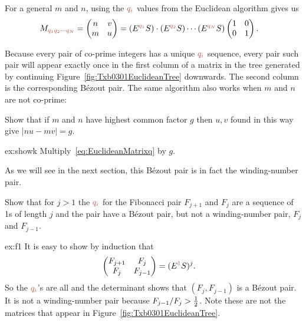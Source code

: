 For a general $m$ and $n$, using the $\jqi$ values from the Euclidean algorithm gives us 
\begin{align}
	M_{\jqn{q_1}\jqn{q_2}\cdots\jqn{q_N}}=\begin{pmatrix} n & v \\ m & u \end{pmatrix}   &= 
	(E^{\jqn{q_1}} S )\cdot( E^{\jqn{q_2}} S ) \cdots  (E^{\jqn{q_N}} S)  \begin{pmatrix} 1&0  \\ 0&1 \end{pmatrix}.
	\label{eq:EuclideanMatrixq}
\end{align}

Because every pair of co-prime integers has a unique $\jqi$ sequence, every pair such pair will appear exactly once in the first column of a matrix in the tree generated by continuing Figure~\ref{fig:Txb0301EuclideanTree} downwards.
The second column is the corresponding B\'ezout pair. The same algorithm also works when $m$ and $n$ are not co-prime:
\begin{jExercise}\label{ex:showk}
	Show that if $m$ and $n$ have highest common factor $g$ then $u,v$ found in this way give $|nu-mv|=g$.
\end{jExercise}
\begin{jAnswer}{ex:showk}{
	Multiply~\eqref{eq:EuclideanMatrixq} by $g$.
}\end{jAnswer}
As we will see in the next section, this B\'ezout pair is in fact the winding-number pair.

\begin{jExercise}\label{ex:f1}
	Show that for $j>1$ the  $\jqi$ for the Fibonacci pair $F_{j+1}$ and $F_j$ are a sequence of 1s of length $j$ and 
	the pair have a B\'ezout pair, but not a winding-number pair,  $F_j$ and $F_{j-1}$.
\end{jExercise}
\begin{jAnswer}{ex:f1}{
		It is easy to show by induction that 
\begin{align}
	\begin{pmatrix} 
		F_{j+1} & F_{j} 
		\\
		F _j & F_{j-1}
	\end{pmatrix} &= 	(E^\jqn{1} S)^{j}.
	\label{eq:FibonacciMatrixB}
\end{align}
So the  $\jqi$'s are all  and the determinant shows that $(F_{j},F_{j-1})$ is a B\'ezout pair. It is not a winding-number pair because $F_{j-1}/F_j>\textstyle{\frac{1}{2}}$. Note these are not the matrices that appear in Figure~\ref{fig:Txb0301EuclideanTree}.
}\end{jAnswer}

